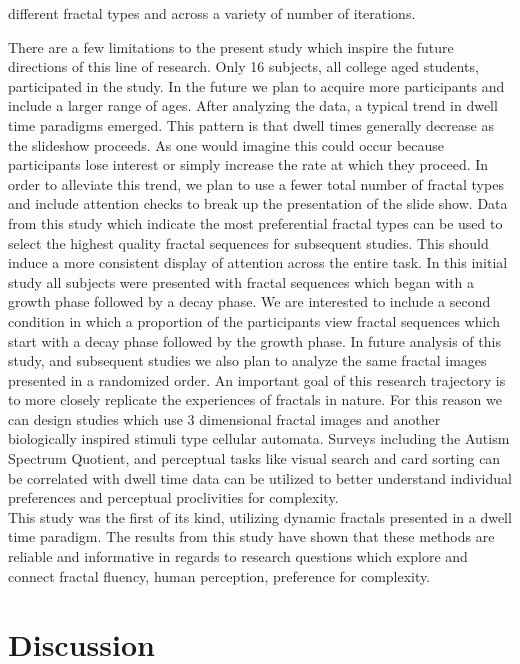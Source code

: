 \documentclass[english,jou]{apa6}
\begin{document}
different fractal types and across a variety of number of iterations.

There are a few limitations to the present study which inspire the future directions of this line of research. Only 16 subjects, all college aged students, participated in the study. In the future we plan to acquire more participants and include a larger range of ages. After analyzing the data, a typical trend in dwell time paradigms emerged. This pattern is that dwell times generally decrease as the slideshow proceeds. As one would imagine this could occur because participants lose interest or simply increase the rate at which they proceed. In order to alleviate this trend, we plan to use a fewer total number of fractal types and include attention checks to break up the presentation of the slide show. Data from this study which indicate the most preferential fractal types can be used to select the highest quality fractal sequences for subsequent studies. This should induce a more consistent display of attention across the entire task. In this initial study all subjects were presented with fractal sequences which began with a growth phase followed by a decay phase. We are interested to include a second condition in which a proportion of the participants view fractal sequences which start with a decay phase followed by the growth phase. In future analysis of this study, and subsequent studies we also plan to analyze the same fractal images presented in a randomized order. An important goal of this research trajectory is to more closely replicate the experiences of fractals in nature. For this reason we can design studies which use 3 dimensional fractal images and another biologically inspired stimuli type cellular automata. Surveys including the Autism Spectrum Quotient, and perceptual tasks like visual search and card sorting can be correlated with dwell time data can be utilized to better understand individual preferences and perceptual proclivities for complexity.\\
This study was the first of its kind, utilizing dynamic fractals presented in a dwell time paradigm. The results from this study have shown that these methods are reliable and informative in regards to research questions which explore and connect fractal fluency, human perception, preference for complexity.

\hypertarget{discussion}{%
\section{Discussion}\label{discussion}}
\end{document}
